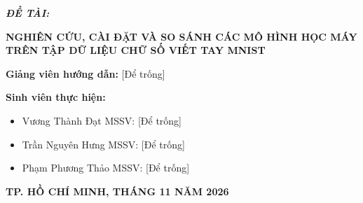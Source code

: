\begin{titlepage}
\vspace{15pt}
\begin{center}
    {\fontsize{12pt}{15pt}\selectfont \textbf{\textsl{ĐỀ TÀI:}}}
    
    \vspace{8pt}
    {\fontsize{15pt}{19pt}\selectfont \textbf{\color{blue!80!black}NGHIÊN CỨU, CÀI ĐẶT VÀ SO SÁNH CÁC MÔ HÌNH HỌC MÁY TRÊN TẬP DỮ LIỆU CHỮ SỐ VIẾT TAY MNIST}}
\end{center}

\vspace{25pt}
\begin{flushleft}
    \fontsize{12pt}{16pt}\selectfont
    \hspace{1.5cm}\textbf{Giảng viên hướng dẫn:} [Để trống]
    
    \vspace{8pt}
    \hspace{1.5cm}\textbf{Sinh viên thực hiện:}
    \begin{itemize}[leftmargin=3.2cm, labelsep=0.5em]
        \item Vương Thành Đạt \hspace{1.5cm} MSSV: [Để trống]
        \item Trần Nguyên Hưng \hspace{1.45cm} MSSV: [Để trống]
        \item Phạm Phương Thảo \hspace{1.35cm} MSSV: [Để trống]
    \end{itemize}
\end{flushleft}

\vfill
\begin{center}
    \textbf{\fontsize{11pt}{14pt}\selectfont TP. HỒ CHÍ MINH, THÁNG 11 NĂM 2026}
\end{center}
\vspace{10pt}
\end{titlepage}
